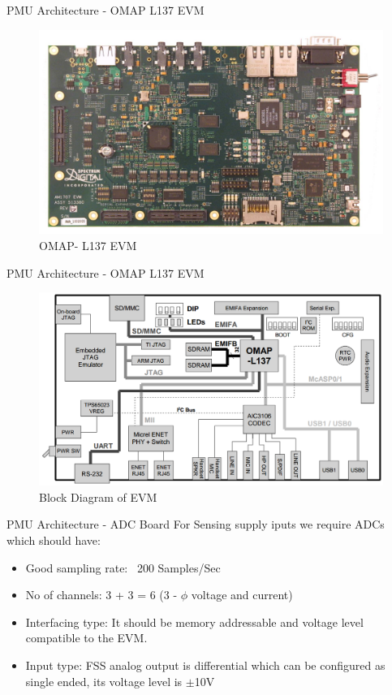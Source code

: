 \documentclass{beamer}
\begin{document}

\begin{frame}{PMU Architecture - OMAP L137 EVM}
\begin{figure}
\includegraphics[width=\textwidth]{fig/omapl137-evm-board.jpg}
\caption{ OMAP- L137 EVM }
\end{figure}
\end{frame}

\begin{frame}{PMU Architecture - OMAP L137 EVM}
\begin{figure}
\includegraphics[width=\textwidth]{fig/OMAP_L137EVM.png}
\caption{Block Diagram of EVM \cite{site:evm}}
\end{figure}
\end{frame}

\begin{frame}{PMU Architecture - ADC Board}
For Sensing supply iputs we require ADCs which should have:
\begin{itemize}
\item Good sampling rate: ~200 Samples/Sec
\item No of channels: 3 + 3 = 6 (3 - $\phi$ voltage and current) 
\item Interfacing type: It should be memory addressable and voltage level compatible  to the EVM.
\item Input type: FSS analog output is differential which can be configured as single ended, its voltage level is $\pm$10V
\end{itemize}
\end{frame}
\end{document}
